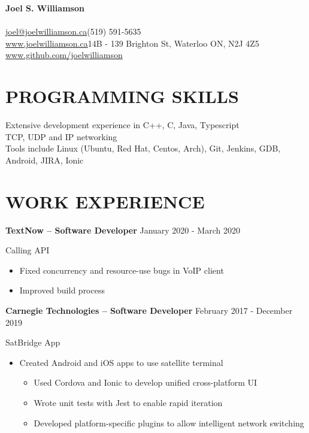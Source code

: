 \documentclass{res}
\begin{document}
 

\begin{center}
{\Large\bf Joel S. Williamson}
\end{center}
\paragraph{}
       \href{mailto:joel@joelwilliamson.ca}{joel@joelwilliamson.ca}\hfill(519) 591-5635\\
       \url{www.joelwilliamson.ca}\hfill14B - 139 Brighton St, Waterloo ON, N2J 4Z5\\
       \url{www.github.com/joelwilliamson}
 
\begin{resume}

  \vspace{-5mm}
  \section{PROGRAMMING SKILLS}
  Extensive development experience in C++, C, Java, Typescript\\
  TCP, UDP and IP networking\\
  Tools include Linux (Ubuntu, Red Hat, Centos, Arch), Git, Jenkins, GDB, Android, JIRA, Ionic
  \section{WORK EXPERIENCE}
         {\bf TextNow -- Software Developer} \hfill January 2020 - March 2020 \vspace{-3mm}

         Calling API
         \begin{itemize}
           \item Fixed concurrency and resource-use bugs in VoIP client
           \item Improved build process
         \end{itemize}

         \vspace{-3mm}
         {\bf Carnegie Technologies -- Software Developer} \hfill February 2017 - December 2019\vspace{-3mm}

         SatBridge App
         \begin{itemize}
           \item Created Android and iOS apps to use satellite terminal
           \begin{itemize}
             \item Used Cordova and Ionic to develop unified cross-platform UI
             \item Wrote unit tests with Jest to enable rapid iteration
             \item Developed platform-specific plugins to allow intelligent network switching
           \end{itemize}
         \end{itemize}


\end{resume}
\end{document}
